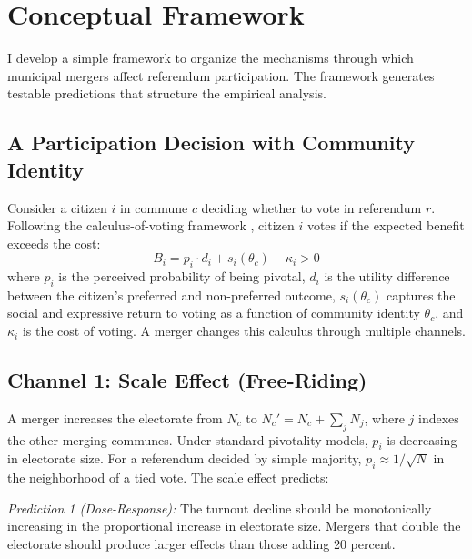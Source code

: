 \documentclass[12pt]{article}
\begin{document}
\section{Conceptual Framework}

I develop a simple framework to organize the mechanisms through which municipal mergers affect referendum participation. The framework generates testable predictions that structure the empirical analysis.

\subsection{A Participation Decision with Community Identity}

Consider a citizen $i$ in commune $c$ deciding whether to vote in referendum $r$. Following the calculus-of-voting framework \citep{downs1957economic, feddersen2004rational}, citizen $i$ votes if the expected benefit exceeds the cost:
\begin{equation}
\label{eq:voting}
    B_i = p_i \cdot d_i + s_i(\theta_c) - \kappa_i > 0
\end{equation}
where $p_i$ is the perceived probability of being pivotal, $d_i$ is the utility difference between the citizen's preferred and non-preferred outcome, $s_i(\theta_c)$ captures the social and expressive return to voting as a function of community identity $\theta_c$, and $\kappa_i$ is the cost of voting. A merger changes this calculus through multiple channels.

\subsection{Channel 1: Scale Effect (Free-Riding)}

A merger increases the electorate from $N_c$ to $N_c' = N_c + \sum_{j} N_j$, where $j$ indexes the other merging communes. Under standard pivotality models, $p_i$ is decreasing in electorate size. For a referendum decided by simple majority, $p_i \approx 1/\sqrt{N}$ in the neighborhood of a tied vote. The scale effect predicts:

\textit{Prediction 1 (Dose-Response):} The turnout decline should be monotonically increasing in the proportional increase in electorate size. Mergers that double the electorate should produce larger effects than those adding 20 percent.
\end{document}

